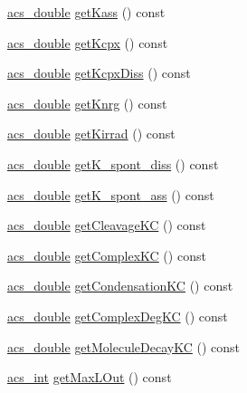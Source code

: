 \begin{DoxyCompactItemize}
\item 
\hyperlink{a00050_ab776853a005fcbf56af0424a2a4dd607}{acs\-\_\-double} \hyperlink{a00014_aa862f1f98c6060747d6f1f30377671ff}{get\-Kass} () const 
\item 
\hyperlink{a00050_ab776853a005fcbf56af0424a2a4dd607}{acs\-\_\-double} \hyperlink{a00014_ac62c6b719db59d5829e3cc451b237f44}{get\-Kcpx} () const 
\item 
\hyperlink{a00050_ab776853a005fcbf56af0424a2a4dd607}{acs\-\_\-double} \hyperlink{a00014_a9091c4a0fe31f6d5f5330e7ebff297a3}{get\-Kcpx\-Diss} () const 
\item 
\hyperlink{a00050_ab776853a005fcbf56af0424a2a4dd607}{acs\-\_\-double} \hyperlink{a00014_a7615c746521a592ff1ab2d0793b14d89}{get\-Knrg} () const 
\item 
\hyperlink{a00050_ab776853a005fcbf56af0424a2a4dd607}{acs\-\_\-double} \hyperlink{a00014_a4c163b36e84cd8406aff4ab5d220a251}{get\-Kirrad} () const 
\item 
\hyperlink{a00050_ab776853a005fcbf56af0424a2a4dd607}{acs\-\_\-double} \hyperlink{a00014_a2c6ca24592b5feab891e43233c581711}{get\-K\-\_\-spont\-\_\-diss} () const 
\item 
\hyperlink{a00050_ab776853a005fcbf56af0424a2a4dd607}{acs\-\_\-double} \hyperlink{a00014_a6557765370b636bc7d4e02288b444c0e}{get\-K\-\_\-spont\-\_\-ass} () const 
\item 
\hyperlink{a00050_ab776853a005fcbf56af0424a2a4dd607}{acs\-\_\-double} \hyperlink{a00014_a771963196a27d3532cd7af4b98a5a9c5}{get\-Cleavage\-K\-C} () const 
\item 
\hyperlink{a00050_ab776853a005fcbf56af0424a2a4dd607}{acs\-\_\-double} \hyperlink{a00014_abf3168adf05ff9fa6bab4e34b387f0a6}{get\-Complex\-K\-C} () const 
\item 
\hyperlink{a00050_ab776853a005fcbf56af0424a2a4dd607}{acs\-\_\-double} \hyperlink{a00014_a7ac1b69dd38107d5c40339563969d09f}{get\-Condensation\-K\-C} () const 
\item 
\hyperlink{a00050_ab776853a005fcbf56af0424a2a4dd607}{acs\-\_\-double} \hyperlink{a00014_ae58bcd60ae01a8ba12f83c1328121c35}{get\-Complex\-Deg\-K\-C} () const 
\item 
\hyperlink{a00050_ab776853a005fcbf56af0424a2a4dd607}{acs\-\_\-double} \hyperlink{a00014_a4ed6ad35297e718398fb42a2b9dbe4ae}{get\-Molecule\-Decay\-K\-C} () const 
\item 
\hyperlink{a00050_a8d277355641a098190360234e2ebde35}{acs\-\_\-int} \hyperlink{a00014_a4c58b3ce555f04f009bcfb7bbc2b0000}{get\-Max\-L\-Out} () const 
\item 

\end{DoxyCompactItemize}
